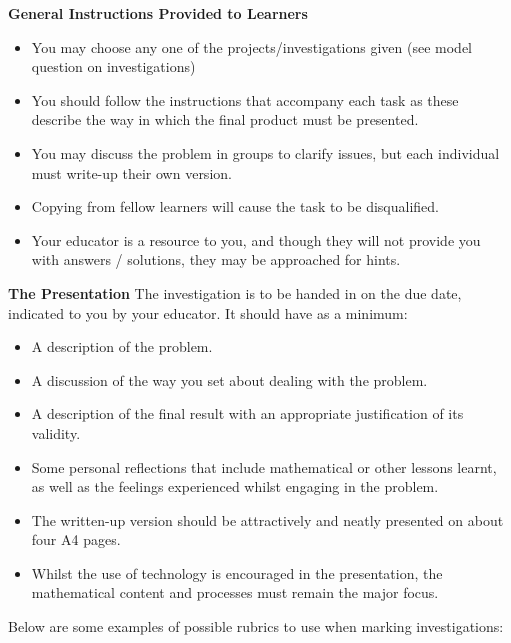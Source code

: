 \textbf{General Instructions Provided to Learners}
\begin{itemize}[noitemsep]
\item You may choose any one of the projects/investigations given (see model question on investigations)
\item You should follow the instructions that accompany each task as these describe the way in which the final product must be presented.
\item You may discuss the problem in groups to clarify issues, but each individual must write-up their own version.
\item Copying from fellow learners will cause the task to be disqualified.
\item Your educator is a resource to you, and though they will not provide you with answers / solutions, they may be approached for hints.
	\end{itemize}	
\textbf{The Presentation}
The investigation is to be handed in on the due date, indicated to you by your educator. It should have as a minimum:
\begin{itemize}[noitemsep]
\item A description of the problem.
\item A discussion of the way you set about dealing with the problem.
\item A description of the final result with an appropriate justification of its validity.
\item Some personal reflections that include mathematical or other lessons learnt, as well as the feelings experienced whilst engaging in the problem.
\item The written-up version should be attractively and neatly presented on about four A4 pages.
\item Whilst the use of technology is encouraged in the presentation, the mathematical content and processes must remain the major focus.
\end{itemize}	
Below are some examples of possible rubrics to use when marking investigations:\par



